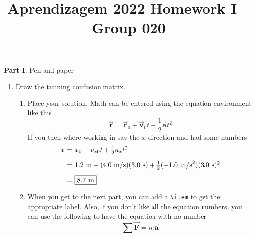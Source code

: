 \documentclass[12pt]{article}
\title{\large{Aprendizagem 2022}\vskip 0.2cm Homework I -- Group 020}
\date{}
\begin{document}
\maketitle
\center\large{\vskip -2.5cm\textbf{Part I}: Pen and paper}
\begin{enumerate}[leftmargin=\labelsep]
    Given the following decision tree learnt from 20 observation using Shannon entropy, with leaf annotations (\texttt{\#correct/\#total}).
    \item Draw the training confusion matrix.
          \begin{enumerate}
              \item Place your solution. Math can be entered using the equation
                    environment like this
                    \begin{equation}
                        \vec{\mathbf{r}} = \vec{\mathbf{r}}_{0} + \vec{\mathbf{v}}_{0}t + \frac{1}{2}\vec{\mathbf{a}}t^{2}
                    \end{equation}
                    If you then where working in say the $x$-direction and had some numbers %
                    \begin{equation}
                        \begin{array}{r@{~=~}l}
                            x & x_{0} + v_{x0}t + \frac{1}{2}a_{x}t^{2}                                                            \\ [2ex]
                              & 1.2~\text{m} + (4.0~\text{m/s})(3.0~\text{s}) + \frac{1}{2}(-1.0~\text{m/s}^{2})(3.0~\text{s})^{2} \\ [2ex]
                              & \boxed{8.7~\text{m}}
                        \end{array}
                    \end{equation}

              \item When you get to the next part, you can add a \verb"\item" to get the appropriate label. Also,
                    if you don't like all the equation numbers, you can use the following to have the equation with
                    no number
                    \begin{equation*}
                        \sum\vec{\mathbf{F}} = m\vec{\mathbf{a}}
                    \end{equation*}


\end{enumerate}
\end{enumerate}
\end{document}

